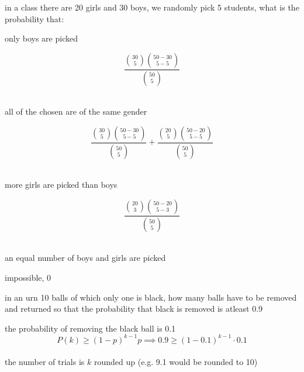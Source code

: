 \documentclass[a4paper,12pt]{article}
\begin{document}
\begin{question}
in a class there are 20 girls and 30 boys, we randomly pick 5 students, what is the probability that:\\
\begin{subquestion}
only boys are picked\\
\begin{answer}
\[
\frac{\binom{30}{5} \binom{50-30}{5-5}}{\binom{50}{5}}
\]\\
\end{answer}
\end{subquestion}
\begin{subquestion}
all of the chosen are of the same gender\\
\begin{answer}
\[
\frac{\binom{30}{5} \binom{50-30}{5-5}}{\binom{50}{5}} + \frac{\binom{20}{5} \binom{50-20}{5-5}}{\binom{50}{5}}
\]\\
\end{answer}
\end{subquestion}
\begin{subquestion}
more girls are picked than boys\\
\begin{answer}
\[
\frac{\binom{20}{3} \binom{50-20}{5-3}}{\binom{50}{5}}
\]\\
\end{answer}
\end{subquestion}
\begin{subquestion}
an equal number of boys and girls are picked\\
\begin{answer}
impossible, 0\\
\end{answer}
\end{subquestion}
\end{question}

\begin{question}
in an urn 10 balls of which only one is black, how many balls have to be removed and returned so that the probability that black is removed is atleast 0.9\\
\begin{answer}
the probability of removing the black ball is 0.1\\
\[
P(k) \ge {(1-p)}^{k-1}p \implies 0.9 \ge {(1-0.1)}^{k-1} \cdot 0.1
\]\\
the number of trials is \(k\) rounded up (e.g. 9.1 would be rounded to 10)\\
\end{answer}
\end{question}
\end{document}
